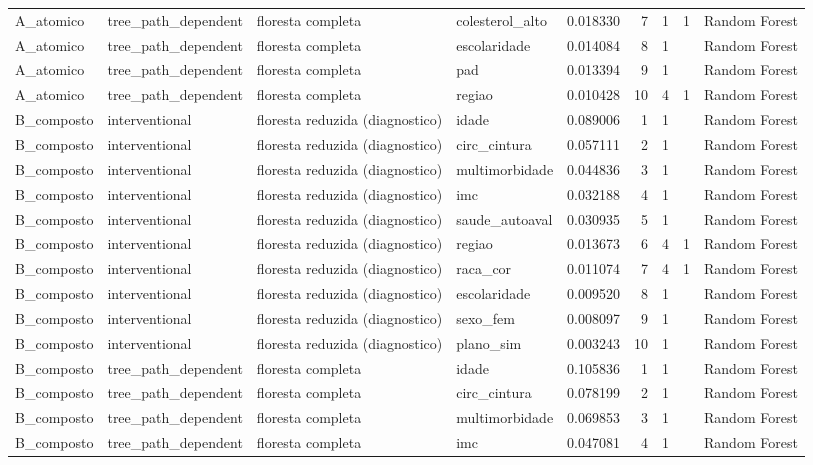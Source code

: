 \begin{tabular}{llllrrrll}
A_atomico & tree_path_dependent & floresta completa & colesterol_alto & 0.018330 & 7 & 1 & 1 & Random Forest \\
A_atomico & tree_path_dependent & floresta completa & escolaridade & 0.014084 & 8 & 1 &  & Random Forest \\
A_atomico & tree_path_dependent & floresta completa & pad & 0.013394 & 9 & 1 &  & Random Forest \\
A_atomico & tree_path_dependent & floresta completa & regiao & 0.010428 & 10 & 4 & 1 & Random Forest \\
B_composto & interventional & floresta reduzida (diagnostico) & idade & 0.089006 & 1 & 1 &  & Random Forest \\
B_composto & interventional & floresta reduzida (diagnostico) & circ_cintura & 0.057111 & 2 & 1 &  & Random Forest \\
B_composto & interventional & floresta reduzida (diagnostico) & multimorbidade & 0.044836 & 3 & 1 &  & Random Forest \\
B_composto & interventional & floresta reduzida (diagnostico) & imc & 0.032188 & 4 & 1 &  & Random Forest \\
B_composto & interventional & floresta reduzida (diagnostico) & saude_autoaval & 0.030935 & 5 & 1 &  & Random Forest \\
B_composto & interventional & floresta reduzida (diagnostico) & regiao & 0.013673 & 6 & 4 & 1 & Random Forest \\
B_composto & interventional & floresta reduzida (diagnostico) & raca_cor & 0.011074 & 7 & 4 & 1 & Random Forest \\
B_composto & interventional & floresta reduzida (diagnostico) & escolaridade & 0.009520 & 8 & 1 &  & Random Forest \\
B_composto & interventional & floresta reduzida (diagnostico) & sexo_fem & 0.008097 & 9 & 1 &  & Random Forest \\
B_composto & interventional & floresta reduzida (diagnostico) & plano_sim & 0.003243 & 10 & 1 &  & Random Forest \\
B_composto & tree_path_dependent & floresta completa & idade & 0.105836 & 1 & 1 &  & Random Forest \\
B_composto & tree_path_dependent & floresta completa & circ_cintura & 0.078199 & 2 & 1 &  & Random Forest \\
B_composto & tree_path_dependent & floresta completa & multimorbidade & 0.069853 & 3 & 1 &  & Random Forest \\
B_composto & tree_path_dependent & floresta completa & imc & 0.047081 & 4 & 1 &  & Random Forest \\

\end{tabular}
